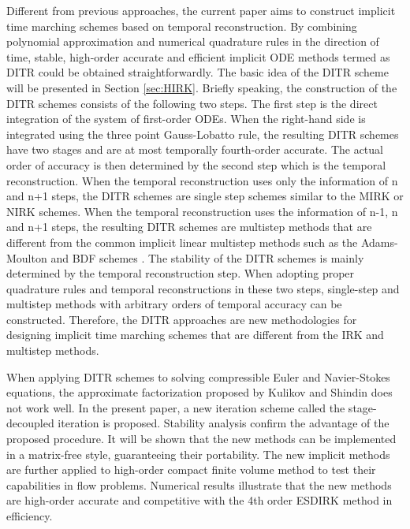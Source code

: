 \documentclass[preprint,12pt]{elsarticle}
\begin{document}
Different from previous approaches,
the current paper aims to construct implicit
time marching schemes based on temporal
reconstruction.
By combining polynomial approximation and
numerical quadrature rules in the direction of time,
stable, 
high-order accurate and efficient implicit ODE methods
termed as DITR could be
obtained straightforwardly.
The basic idea of the DITR scheme will be presented
in Section \ref{sec:HIRK}. 
Briefly speaking, the construction of the DITR
schemes consists of the following two steps. 
The first step is the direct integration of the 
system of first-order ODEs.
When the right-hand side is integrated using the
three point Gauss-Lobatto rule, the resulting DITR
schemes have two stages and are at most temporally fourth-order accurate. 
The actual order of accuracy is then determined by
the second step which is the temporal reconstruction. 
When the temporal reconstruction uses only the information of n
and n+1 steps, the DITR schemes are single step schemes
similar to the MIRK or NIRK schemes. 
When the temporal reconstruction uses the information of n-1, n and n+1 steps,
the resulting DITR schemes are multistep methods that are
different from the common implicit linear multistep 
methods such as
the Adams-Moulton and BDF schemes \cite{wanner1996solving}. 
The stability of the DITR
schemes is mainly determined by the temporal
reconstruction step. 
When adopting proper quadrature rules
and temporal reconstructions in these two steps, single-step
and multistep methods with arbitrary orders of temporal
accuracy can be constructed. Therefore, the DITR approaches
are new methodologies for designing implicit time marching
schemes that are different from the IRK and multistep
methods. 

When applying DITR schemes to solving compressible Euler and
Navier-Stokes equations, the approximate factorization
proposed by Kulikov and Shindin \cite{kulikov2007asymptotic} 
does not work well. 
In the present paper, 
a new iteration scheme called the stage-decoupled iteration 
is proposed. 
Stability analysis
confirm the advantage of the proposed procedure.
It will be shown that the new methods can be implemented
in a matrix-free style, guaranteeing their portability.
The new implicit methods are further applied to
high-order compact finite volume method to
test their capabilities in flow problems. Numerical results
illustrate that the new methods are high-order accurate
and competitive with the 4th order ESDIRK method in efficiency.
\end{document}
